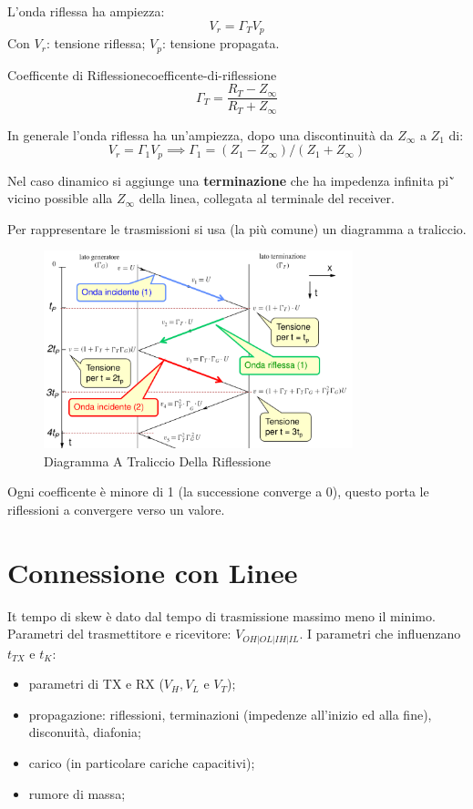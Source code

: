 \documentclass[12pt]{article}
\begin{document}
L'onda riflessa ha ampiezza:
\[ \boxed{V_r = \Gamma_T V_p} \]
Con $V_r$: tensione riflessa; $V_p$: tensione propagata.
\begin{definition}{Coefficente di Riflessione}{coefficente-di-riflessione}
    \[ \Gamma_T = \frac{R_T - Z_{\infty}}{R_T + Z _{\infty}}  \]
\end{definition}

In generale l'onda riflessa ha un'ampiezza, dopo una discontinuit\`a da $Z _{\infty}$ a $Z_1$ di:
\[ V_r = \Gamma_1 V_p \implies \Gamma_1 = (Z_1 - Z_{\infty})/(Z_1+Z _{\infty}) \]

Nel caso dinamico si aggiunge una \textbf{terminazione} che ha impedenza infinita pi\u` vicino possible alla $Z _{\infty}$ della linea, collegata al terminale del receiver.

Per rappresentare le trasmissioni si usa (la pi\`u comune) un diagramma a traliccio.
\begin{figure}[H]
    \centering
    \includegraphics[width=0.8\textwidth]{diagramma-a-traliccio-della-riflessione.png}
    \caption{Diagramma A Traliccio Della Riflessione}
    \label{fig:diagramma-a-traliccio-della-riflessione}
\end{figure}

Ogni coefficente \`e minore di 1 (la successione converge a 0), questo porta le riflessioni a convergere verso un valore.


\section{Connessione con Linee}
It tempo di skew \`e dato dal tempo di trasmissione massimo meno il minimo.\\
Parametri del trasmettitore e ricevitore: $V_{OH|OL|IH|IL}$.
I parametri che influenzano $t _{TX}$ e $t_K$:
\begin{itemize}
    \item parametri di TX e RX ($V_H, V_L$ e $V_T$);
    \item propagazione: riflessioni, terminazioni (impedenze all'inizio ed alla fine), disconuit\`a, diafonia;
    \item carico (in particolare cariche capacitivi);
    \item rumore di massa;
\end{itemize}
\end{document}
